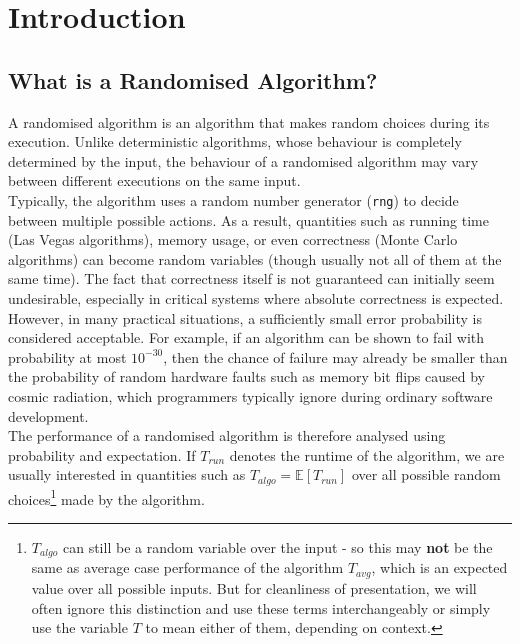 \chapter{Introduction}

\section{What is a Randomised Algorithm?}

A randomised algorithm is an algorithm that makes random choices during its execution. 
Unlike deterministic algorithms, whose behaviour is completely determined by the input, 
the behaviour of a randomised algorithm may vary between different executions on the same input.\\


\noindent Typically, the algorithm uses a random number generator (\texttt{rng}) to decide between multiple 
possible actions. As a result, quantities such as running time (Las Vegas algorithms), memory usage, 
or even correctness (Monte Carlo algorithms) can become random variables (though usually not all of 
them at the same time). The fact that correctness itself is not guaranteed can initially 
seem undesirable, especially in critical systems where absolute correctness is expected. 
However, in many practical situations, a sufficiently small error probability is considered acceptable. 
For example, if an algorithm can be shown to fail with probability at most \(10^{-30}\), then the 
chance of failure may already be smaller than the probability of random hardware faults such as 
memory bit flips caused by cosmic radiation, which programmers typically ignore during 
ordinary software development.\\


\noindent The performance of a randomised algorithm is therefore analysed using probability and expectation. 
If $T_{run}$ denotes the runtime of the algorithm, we are usually interested in quantities 
such as $T_{algo}=\mathbb E[T_{run}]$ over all possible random choices\footnote{$T_{algo}$ can still be a 
random variable over the input - so this may \textbf{not} be the same as average case performance 
of the algorithm $T_{avg}$, which is an expected value over all possible inputs.
But for cleanliness of presentation, we will often ignore this distinction and use these terms 
interchangeably or simply use the variable $T$ to mean either of them, depending on context.} made by 
the algorithm.\\

